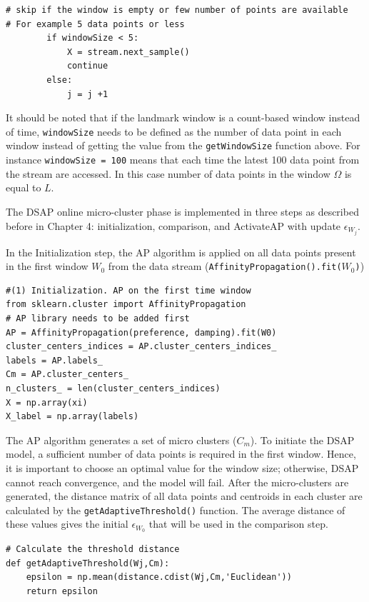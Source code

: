\begin{lstlisting}
# skip if the window is empty or few number of points are available
# For example 5 data points or less 
        if windowSize < 5:
            X = stream.next_sample()
            continue
        else:    
            j = j +1
\end{lstlisting}


It should be noted that if the landmark window is a count-based window instead of time, \texttt{windowSize} needs to be defined as the number of data point in each window instead of getting the value from the \texttt{getWindowSize} function above. For instance \texttt{windowSize = 100} means that each time the latest 100 data point from the stream are accessed. In this case number of data points in the window $\Omega$ is equal to $L$.

The DSAP online micro-cluster phase is implemented in three steps as described before in Chapter 4: initialization, comparison, and ActivateAP with update $\epsilon_{W_j}$.

In the Initialization step, the AP algorithm is applied on all data points present in the first window $W_0$ from the data stream (\texttt{AffinityPropagation().fit($W_0$)})

\begin{lstlisting}
#(1) Initialization. AP on the first time window
from sklearn.cluster import AffinityPropagation 
# AP library needs to be added first
AP = AffinityPropagation(preference, damping).fit(W0)
cluster_centers_indices = AP.cluster_centers_indices_
labels = AP.labels_
Cm = AP.cluster_centers_
n_clusters_ = len(cluster_centers_indices)
X = np.array(xi)
X_label = np.array(labels)
\end{lstlisting}

The AP algorithm generates a set of micro clusters ($C{_m}$). To initiate the DSAP model, a sufficient number of data points is required in the first window. Hence, it is important to choose an optimal value for the window size; otherwise, DSAP cannot reach convergence, and the model will fail. After the micro-clusters are generated, the distance matrix of all data points and centroids in each cluster are calculated by the \texttt{getAdaptiveThreshold()} function. The average distance of these values gives the initial $\epsilon_{W_0}$ that will be used in the comparison step.


\begin{lstlisting}
# Calculate the threshold distance
def getAdaptiveThreshold(Wj,Cm):
    epsilon = np.mean(distance.cdist(Wj,Cm,'Euclidean'))
    return epsilon 
\end{lstlisting}

